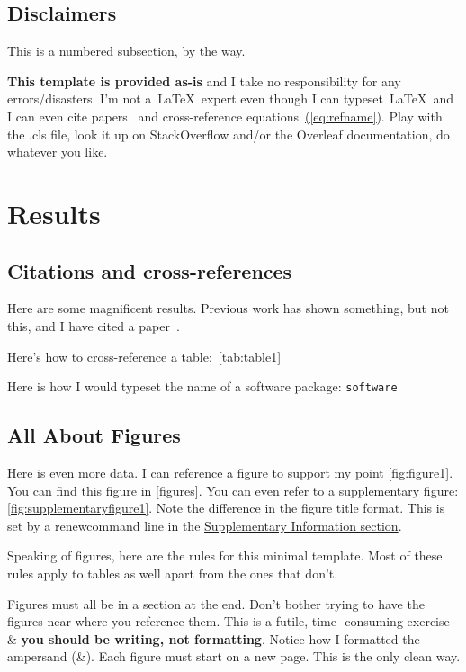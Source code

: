 \documentclass{getwriting}
\begin{document}
\subsection{Disclaimers}
This is a numbered subsection, by the way.
\par
\textbf{This template is provided as-is} and I take no responsibility for any errors/disasters. I'm not a~\LaTeX~expert even though I can typeset~\LaTeX~and I can even cite papers~\cite{scbonita} and cross-reference equations~\hyperref[eq:refname]{(\autoref{eq:refname})}. Play with the .cls file, look it up on StackOverflow and/or the Overleaf documentation, do whatever you like.
\section{Results}\label{results}
\subsection{Citations and cross-references}
Here are some magnificent results. Previous work has shown something, but not this, and I have cited a paper~\cite{scbonita}. 
\par
Here's how to cross-reference a table:~\hyperref[tab:table1]{\autoref{tab:table1}}
\par
Here is how I would typeset the name of a software package: \lstinline{software}
\subsection{All About Figures}
Here is even more data. I can reference a figure to support my point \hyperref[fig:figure1]{\autoref{fig:figure1}}.
You can find this figure in \hyperref[figures]{\autoref{figures}}. You can even refer to a supplementary figure: \hyperref[fig:supplementaryfigure1]{\autoref{fig:supplementaryfigure1}}. Note the difference in the figure title format. This is set by a renewcommand line in the \hyperref[suppinfo]{Supplementary Information section}.
\par
Speaking of figures, here are the rules for this minimal template. Most of these rules apply to tables as well apart from the ones that don't.
\begin{outline}
    \1 Figures must all be in a section at the end. Don't bother trying to have the figures near where you reference them. This is a futile, time- consuming exercise \& \textbf{you should be writing, not formatting}. Notice how I formatted the ampersand (\&).
    \1 Each figure must start on a new page. This is the only clean way.
\end{outline}
\end{document}
